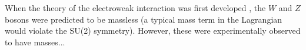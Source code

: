 ﻿When the theory of the electroweak interaction was first developed \cite{1959.Glashow.vector-mesons, 1959.Salam.electroweak},
the $W$ and $Z$ bosons were predicted to be massless (a typical mass term in the Lagrangian would violate the SU(2) symmetry).
However, these were experimentally observed to have masses...
